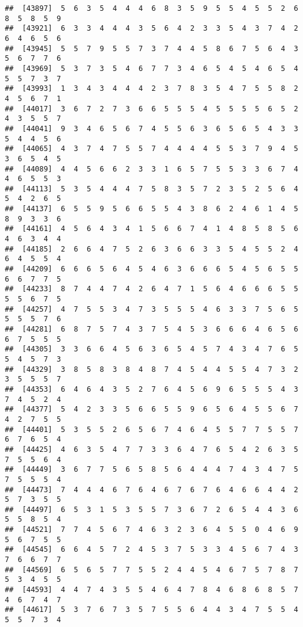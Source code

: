 \documentclass[
]{book}
\begin{document}
\begin{verbatim}
##  [43897]  5  6  3  5  4  4  4  6  8  3  5  9  5  5  4  5  5  2  6  8  5  8  5  9
##  [43921]  6  3  3  4  4  4  3  5  6  4  2  3  3  5  4  3  7  4  2  6  4  6  5  6
##  [43945]  5  5  7  9  5  5  7  3  7  4  4  5  8  6  7  5  6  4  3  5  6  7  7  6
##  [43969]  5  3  7  3  5  4  6  7  7  3  4  6  5  4  5  4  6  5  4  5  5  7  3  7
##  [43993]  1  3  4  3  4  4  4  2  3  7  8  3  5  4  7  5  5  8  2  4  5  6  7  1
##  [44017]  3  6  7  2  7  3  6  6  5  5  5  4  5  5  5  5  6  5  2  4  3  5  5  7
##  [44041]  9  3  4  6  5  6  7  4  5  5  6  3  6  5  6  5  4  3  3  5  4  4  5  6
##  [44065]  4  3  7  4  7  5  5  7  4  4  4  4  5  5  3  7  9  4  5  3  6  5  4  5
##  [44089]  4  4  5  6  6  2  3  3  1  6  5  7  5  5  3  3  6  7  4  4  6  5  5  3
##  [44113]  5  3  5  4  4  4  7  5  8  3  5  7  2  3  5  2  5  6  4  5  4  2  6  5
##  [44137]  6  5  5  9  5  6  6  5  5  4  3  8  6  2  4  6  1  4  5  8  9  3  3  6
##  [44161]  4  5  6  4  3  4  1  5  6  6  7  4  1  4  8  5  8  5  6  4  6  3  4  4
##  [44185]  2  6  6  4  7  5  2  6  3  6  6  3  3  5  4  5  5  2  4  6  4  5  5  4
##  [44209]  6  6  6  5  6  4  5  4  6  3  6  6  6  5  4  5  6  5  5  6  6  7  7  5
##  [44233]  8  7  4  4  7  4  2  6  4  7  1  5  6  4  6  6  6  5  5  5  5  6  7  5
##  [44257]  4  7  5  5  3  4  7  3  5  5  5  4  6  3  3  7  5  6  5  5  5  5  7  6
##  [44281]  6  8  7  5  7  4  3  7  5  4  5  3  6  6  6  4  6  5  6  6  7  5  5  5
##  [44305]  3  3  6  6  4  5  6  3  6  5  4  5  7  4  3  4  7  6  5  5  4  5  7  3
##  [44329]  3  8  5  8  3  8  4  8  7  4  5  4  4  5  5  4  7  3  2  3  5  5  5  7
##  [44353]  6  4  6  4  3  5  2  7  6  4  5  6  9  6  5  5  5  4  3  7  4  5  2  4
##  [44377]  5  4  2  3  3  5  6  6  5  5  9  6  5  6  4  5  5  6  7  4  2  7  5  5
##  [44401]  5  3  5  5  2  6  5  6  7  4  6  4  5  5  7  7  5  5  7  6  7  6  5  4
##  [44425]  4  6  3  5  4  7  7  3  3  6  4  7  6  5  4  2  6  3  5  7  5  5  6  4
##  [44449]  3  6  7  7  5  6  5  8  5  6  4  4  4  7  4  3  4  7  5  7  5  5  5  4
##  [44473]  7  4  4  4  6  7  6  4  6  7  6  7  6  4  6  6  4  4  2  5  7  3  5  5
##  [44497]  6  5  3  1  5  3  5  5  7  3  6  7  2  6  5  4  4  3  6  5  5  8  5  4
##  [44521]  7  7  4  5  6  7  4  6  3  2  3  6  4  5  5  0  4  6  9  5  6  7  5  5
##  [44545]  6  6  4  5  7  2  4  5  3  7  5  3  3  4  5  6  7  4  3  7  6  6  7  7
##  [44569]  6  5  6  5  7  7  5  5  2  4  4  5  4  6  7  5  7  8  7  5  3  4  5  5
##  [44593]  4  4  7  4  3  5  5  4  6  4  7  8  4  6  8  6  8  5  7  4  6  7  4  7
##  [44617]  5  3  7  6  7  3  5  7  5  5  6  4  4  3  4  7  5  5  4  5  5  7  3  4

\end{verbatim}
\end{document}
